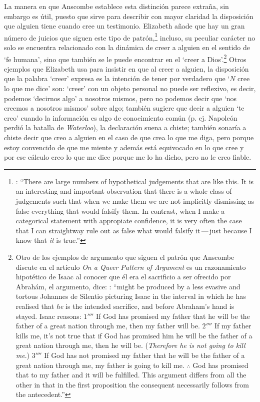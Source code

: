 La manera en que Anscombe establece esta distinción parece extraña, sin embargo es útil, puesto que sirve para describir con mayor claridad la disposición que alguien tiene cuando cree un testimonio. Elizabeth añade que hay un gran número de juicios que siguen este tipo de patrón,\footnote{\cite[Cf.~][302]{anscombe2015logic:qpa}: \enquote{There are large numbers of hypothetical judgements that are like this. It is an interesting and important observation that there is a whole class of judgements such that when we make them we are not implicitly dismissing as false everything that would falsify them. In contrast, when I make a categorical statement with appropiate confidence, it is very often the case that I can straightway rule out as false what would falsify it\,---\,just because I know that \emph{it} is true.}} incluso, su peculiar carácter no solo se encuentra relacionado con la dinámica de creer a alguien en el sentido de `fe humana', sino que también se le puede encontrar en el `creer a Dios'.\footnote{Otro de los ejemplos de argumento que siguen el patrón que Anscombe discute en el artículo \emph{On a Queer Pattern of Argument} es un razonamiento hipotético de Isaac al conocer que él era el sacrificio a ser ofrecido por Abrahám, el argumento, dice: \cite[Cf.~][309]{anscombe2015logic:qpa}: \enquote{might be produced by a less evasive and tortous Johannes de Silentio picturing Isaac in the interval in which he has realised that \emph{he} is the intended sacrifice, and before Abraham's hand is stayed. Isaac reasons: $1''''$  If God has promised my father that he will be the father of a great nation through me, then my father will be. $2''''$  If my father kills me, it's not true that if God has promised him he will be the father of a great nation through me, then he will be. (\emph{Therefore he is not going to kill me}.) $3''''$  If God has not promised my father that he will be the father of a great nation through me, my father is going to kill me. $\mathbf{\therefore}$  God has promised that to my father and it will be fulfilled. This argument differs from all the other in that in the first proposition the consequent necessarily follows from the antecedent.}} Otros ejemplos que Elizabeth usa para insistir en que al creer a alguien, la disposición que la palabra `creer' expresa es la intención de tener por verdadero que \enquote*{$N$ cree lo que me dice} son: `creer' con un objeto personal no puede ser reflexivo, es decir, podemos `decirnos algo' a nosotros mismos, pero no podemos decir que `nos creemos a nosotros mismos' sobre algo; también sugiere que decir a alguien \enquote*{te creo} cuando la información es algo de conocimiento común (p. ej. Napoleón perdió la batalla de \emph{Waterloo}), la declaración suena a chiste; también sonaría a chiste decir que creo a alguien en el caso de que crea lo que me diga, pero porque estoy convencido de que me miente y además está equivocado en lo que cree y por ese cálculo creo lo que me dice porque me lo ha dicho, pero no le creo fiable.

